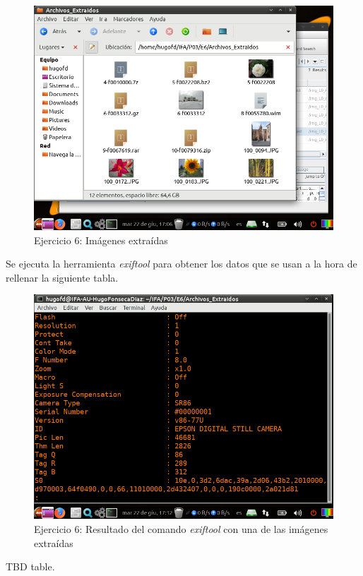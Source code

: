 \documentclass[11pt]{article}
\begin{document}
\begin{figure}[H]
    \caption{Ejercicio 6: Imágenes extraídas}
    \centering
    \includegraphics[scale=0.7]{e6-6.png}
\end{figure}

Se ejecuta la herramienta \textit{exiftool} para obtener los datos que se usan a la hora de rellenar la siguiente tabla.

\begin{figure}[H]
    \caption{Ejercicio 6: Resultado del comando \textit{exiftool} con una de las imágenes extraídas}
    \centering
    \includegraphics[scale=0.7]{e6-7.png}
\end{figure}

TBD table.
\end{document}
